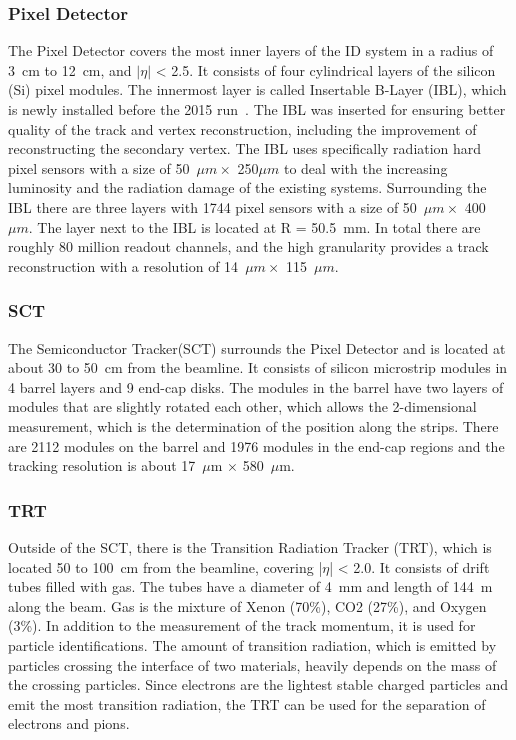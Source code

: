 \subsubsection{Pixel Detector}
The Pixel Detector covers the most inner layers of the ID system in a radius of 3~cm to 12~cm, and $|\eta|$ < 2.5. 
It consists of four cylindrical layers of the silicon (Si) pixel modules.
The innermost layer is called Insertable B-Layer (IBL), which is newly installed before the 2015 run~\cite{PIX-2018-001}. 
The IBL was inserted for ensuring better quality of the track and vertex reconstruction, including the improvement of reconstructing the secondary vertex.
The IBL uses specifically radiation hard pixel sensors with a size of 50~$\mu m \times$ 250$\mu m$ to deal with the increasing luminosity and the radiation damage of the existing systems. 
Surrounding the IBL there are three layers with 1744 pixel sensors with a size of 50~$\mu m \times$ 400~$\mu m$. 
The layer next to the IBL is located at R = 50.5~mm. In total there are roughly 80 million readout channels, and the high granularity provides a track reconstruction with a resolution of 14~$\mu m  \times$ 115~$\mu m$.

\subsubsection{SCT}
The Semiconductor Tracker(SCT) surrounds the Pixel Detector and is located at about 30 to 50~cm from the beamline. 
It consists of silicon microstrip modules in 4 barrel layers and 9 end-cap disks.
The modules in the barrel have two layers of modules that are slightly rotated each other, which allows the 2-dimensional measurement, which is the determination of the position along the strips. There are 2112 modules on the barrel and 1976 modules in the end-cap regions and the tracking resolution is about 17~$\mu$m $\times$ 580~$\mu$m.

\subsubsection{TRT}
Outside of the SCT, there is the Transition Radiation Tracker (TRT), which is located 50 to 100~cm from the beamline, covering |$\eta$| < 2.0.
It consists of drift tubes filled with gas. The tubes have a diameter of 4~mm and length of 144~m along the beam. Gas is the  mixture of Xenon (70\%), CO2 (27\%), and Oxygen (3\%). 
In addition to the measurement of the track momentum, it is used for particle identifications. 
The amount of transition radiation, which is emitted by particles crossing the interface of two materials, heavily depends on the mass of the crossing particles. Since electrons are the lightest stable charged particles and emit the most transition radiation, the TRT can be used for the separation of electrons and pions.

